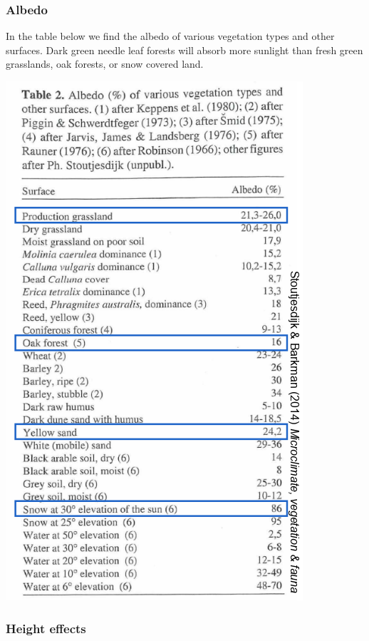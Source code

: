 \documentclass[12pt,oneside]{book}
\begin{document}
\subsubsection{Albedo}\label{albedo}

In the table below we find the albedo of various vegetation types and
other surfaces. Dark green needle leaf forests will absorb more sunlight
than fresh green grasslands, oak forests, or snow covered land.

\begin{center}
\label{table:albedoss}

\begin{center}\includegraphics[width=0.8\linewidth]{figures/Table101} \end{center}
\end{center}

\subsubsection{Height effects}\label{height-effects}
\end{document}
